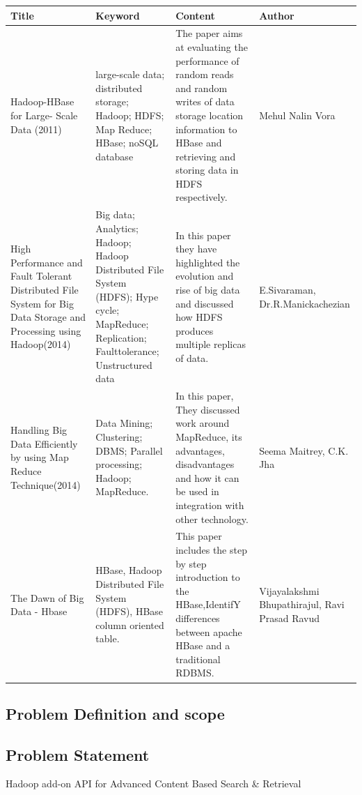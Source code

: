 \documentclass[oneside,a4paper,12pt]{report}
\begin{document}
{\tabulinesep=2mm
   \begin{longtabu} { |p{3.5cm} | p{3.5cm} | p{3.5cm }| p{3.5cm }|}
       \hline

\textbf{Title} & \textbf{Keyword} & \textbf{Content} & \textbf{Author}\\ \hline
Hadoop-HBase for Large- Scale  Data (2011) &
large-scale  data;  distributed  storage;  Hadoop; HDFS; Map Reduce; HBase; noSQL database &
The  paper  aims  at evaluating the performance of random reads and random writes of data storage location information to HBase and retrieving and storing  data  in  HDFS  respectively. &
Mehul Nalin Vora \\ \hline

High Performance and Fault Tolerant Distributed File System for Big Data Storage and Processing using Hadoop(2014) &
Big data; Analytics; Hadoop; Hadoop Distributed File System (HDFS); Hype cycle; MapReduce; Replication; Faulttolerance; Unstructured data &
In this paper they have highlighted the evolution and rise of big data  and discussed how HDFS produces multiple replicas of data. &
E.Sivaraman, Dr.R.Manickachezian \\ \hline

Handling Big Data Efficiently by using Map Reduce Technique(2014) &
Data Mining; Clustering; DBMS; Parallel processing; Hadoop; MapReduce. &
 In this paper, They discussed work around MapReduce, its advantages, disadvantages and how it can be used in integration with other technology. &
Seema Maitrey, C.K. Jha \\ \hline

The Dawn of Big Data - Hbase &
HBase, Hadoop Distributed File System (HDFS), HBase column oriented table. &
This paper includes the step by step introduction to the HBase,IdentifY differences between apache HBase and a traditional RDBMS. &
Vijayalakshmi Bhupathirajul, Ravi Prasad Ravud \\ \hline
      
   \end{longtabu}
}




\begin{center}
\chapter{Problem Definition and scope}
\end{center}

\newpage
\section{Problem Statement}
Hadoop add-on API for Advanced Content Based Search \& Retrieval
\end{document}
